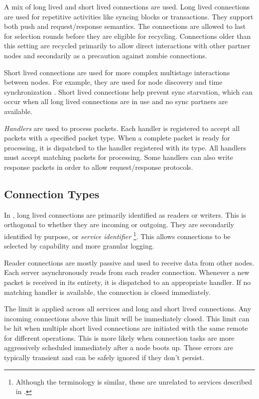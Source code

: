 A mix of long lived and short lived connections are used.
Long lived connections are used for repetitive activities like syncing blocks or transactions.
They support both push and request/response semantics.
The connections are allowed to last for  selection rounds  before they are eligible for recycling.
Connections older than this setting are recycled primarily to allow direct interactions with other partner nodes and secondarily as a precaution against zombie connections.

Short lived connections are used for more complex multistage interactions between nodes.
For example, they are used for node discovery  and time synchronization .
Short lived connections help prevent sync starvation, which can occur when all long lived connections are in use and no sync partners are available.

\emph{Handlers} are used to process packets.
Each handler is registered to accept all packets with a specified packet type.
When a complete packet is ready for processing, it is dispatched to the handler registered with its type.
All handlers must accept matching packets for processing.
Some handlers can also write response packets in order to allow request/response protocols.

\subsection{Connection Types}

In \codename, long lived connections are primarily identified as readers or writers.
This is orthogonal to whether they are incoming or outgoing.
They are secondarily identified by purpose, or \emph{service identifier}
\footnote{Although the terminology is similar, these are unrelated to services described in .}.
This allows connections to be selected by capability and more granular logging.

Reader connections are mostly passive and used to receive data from other nodes.
Each server asynchronously reads from each reader connection.
Whenever a new packet is received in its entirety, it is dispatched to an appropriate handler.
If no matching handler is available, the connection is closed immediately.

The  limit is applied across all services and long and short lived connections.
Any incoming connections above this limit will be immediately closed.
This limit can be hit when multiple short lived connections are initiated with the same remote for different operations.
This is more likely when connection tasks are more aggressively scheduled immediately after a node boots up.
These errors are typically transient and can be safely ignored if they don't persist.

